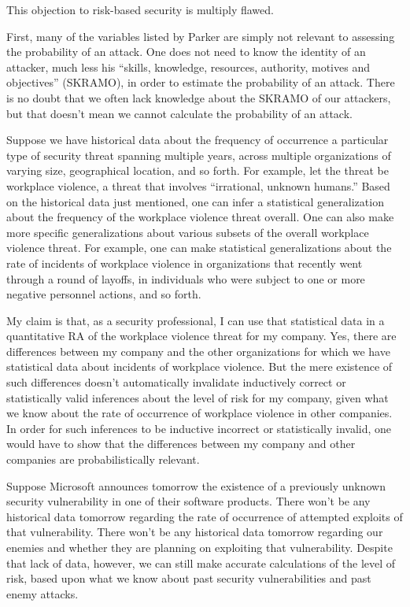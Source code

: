 This objection to risk-based security is multiply flawed.

First, many of the variables listed by Parker are simply not relevant to
assessing the probability of an attack. One does not need to know the
identity of an attacker, much less his ``skills, knowledge, resources,
authority, motives and objectives'' (SKRAMO), in order to estimate the
probability of an attack. There is no doubt that we often lack knowledge
about the SKRAMO of our attackers, but that doesn't mean we cannot
calculate the probability of an attack.

Suppose we have historical data about the frequency of occurrence a
particular type of security threat spanning multiple years, across
multiple organizations of varying size, geographical location, and so
forth. For example, let the threat be workplace violence, a threat that
involves ``irrational, unknown humans.'' Based on the historical data
just mentioned, one can infer a statistical generalization about the
frequency of the workplace violence threat overall. One can also make
more specific generalizations about various subsets of the overall
workplace violence threat. For example, one can make statistical
generalizations about the rate of incidents of workplace violence in
organizations that recently went through a round of layoffs, in
individuals who were subject to one or more negative personnel actions,
and so forth.

My claim is that, as a security professional, I can use that statistical
data in a quantitative RA of the workplace violence threat for my
company. Yes, there are differences between my company and the other
organizations for which we have statistical data about incidents of
workplace violence. But the mere existence of such differences doesn't
automatically invalidate inductively correct or statistically valid
inferences about the level of risk for my company, given what we know
about the rate of occurrence of workplace violence in other companies.
In order for such inferences to be inductive incorrect or statistically
invalid, one would have to show that the differences between my company
and other companies are probabilistically relevant.

Suppose Microsoft announces tomorrow the existence of a previously
unknown security vulnerability in one of their software products. There
won't be any historical data tomorrow regarding the rate of occurrence
of attempted exploits of that vulnerability. There won't be any
historical data tomorrow regarding our enemies and whether they are
planning on exploiting that vulnerability. Despite that lack of data,
however, we can still make accurate calculations of the level of risk,
based upon what we know about past security vulnerabilities and past
enemy attacks.

